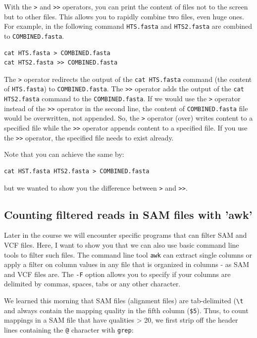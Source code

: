 \documentclass[11pt]{article}
\begin{document}
With the \texttt{>} and \texttt{>>} operators, you can print the content of files
not to the screen but to other files. This allows you to rapidly combine
two files, even huge ones. For example, in the following command
\texttt{HTS.fasta} and \texttt{HTS2.fasta} are combined to
\texttt{COMBINED.fasta}.

\begin{verbatim}
cat HTS.fasta > COMBINED.fasta
cat HTS2.fasta >> COMBINED.fasta
\end{verbatim}

The \texttt{>} operator redirects the output of the \texttt{cat HTS.fasta}
command (the content of \texttt{HTS.fasta}) to \texttt{COMBINED.fasta}. The
\texttt{>>} operator adds the output of the \texttt{cat HTS2.fasta} command to
the \texttt{COMBINED.fasta}. If we would use the \texttt{>} operator instead of
the \texttt{>>} operator in the second line, the content of
\texttt{COMBINED.fasta} file would be overwritten, not appended. So, the \texttt{>}
operator (over) writes content to a specified file while the \texttt{>>}
operator appends content to a specified file. If you use the \texttt{>>}
operator, the specified file needs to exist already.

Note that you can achieve the same by:

\begin{verbatim}
cat HST.fasta HTS2.fasta > COMBINED.fasta
\end{verbatim}

but we wanted to show you the difference between \texttt{>} and \texttt{>>}.

\subsection{Counting filtered reads in SAM files with 'awk'}
\label{sec:orgheadline24}
Later in the course we will encounter specific programs that can filter
SAM and VCF files. Here, I want to show you that we can also use basic
command line tools to filter such files.  The command line tool \texttt{awk}
can extract single columns or apply a filter on column values in
any file that is organized in columns - as SAM and VCF files
are. The \texttt{-F} option allows you to specify if your columns are
delimited by commas, spaces, tabs or any other character.

We learned this morning that SAM files (alignment files) are
 tab-delimited (\texttt{\textbackslash{}t} and always contain the mapping quality in the
 fifth column (\texttt{\$5}). Thus, to count mappings in a SAM file that
 have qualities > 20, we first strip off the header lines
 containing the \texttt{@} character  with \texttt{grep}:
\end{document}
